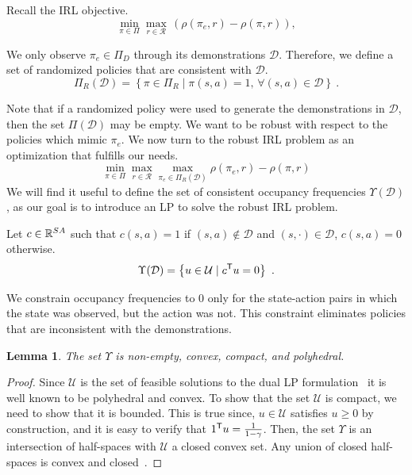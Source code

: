\documentclass[10pt]{article}
\renewcommand{\cite}{\citep}
\newtheorem{lemma}{Lemma}
\begin{document}
Recall the IRL objective.
\begin{equation}
	\min_{\pi \in \Pi} \max_{r \in \mathcal{R}}  \, (\rho(\pi_e, r) - \rho(\pi, r)),
\end{equation}

We only observe $\pi_e \in \Pi_D$ through its demonstrations $\mathcal{D}$. Therefore, we define a set of randomized policies that are consistent with $\mathcal{D}$.
%
\begin{equation} \label{eq:consistent-policies}
	\Pi_R(\mathcal{D}) = \left\{ \pi \in \Pi_R \mid \pi(s,a) = 1, \, \forall (s,a) \in \mathcal{D} \right\}~.
\end{equation}

Note that if a randomized policy were used to generate the demonstrations in
$\mathcal{D}$, then the set $\Pi(\mathcal{D})$ may be empty. We want to be robust with respect to the policies which mimic $\pi_e$.
We now turn to the robust IRL problem as an optimization that fulfills our needs.
%
\begin{equation}
	\label{eq:robust_IRL_formulation}
	\min_{\pi \in \Pi} \max_{r \in \mathcal{R}} \max_{\pi_e \in \Pi_{R}(\mathcal{D})} \rho(\pi_e, r) - \rho(\pi, r)
\end{equation}
%
We will find it useful to define the set of consistent occupancy frequencies $\Upsilon(\mathcal{D})$, as our goal is to introduce an LP to solve
the robust IRL problem.

Let $c \in \mathbb{R}^{SA}$ such that $c(s,a) = 1$ if $(s,a) \notin \mathcal{D}$ and $(s, \cdot) \in \mathcal{D}$, $c(s,a)  = 0$ otherwise.
%
\begin{equation}\label{eq:consistent-occupancies}
	\Upsilon(\mathcal{D}) = \left\{ u \in \mathcal{U} \mid c^{\mathsf{T}} u = 0  \right\}~.
\end{equation}


We constrain occupancy frequencies to 0 only for the state-action pairs in which the state was observed, but the action was not. This constraint eliminates policies that are inconsistent with the demonstrations.
%
\begin{lemma}\label{prop:convexity_of_Upsilon}
The set $\Upsilon$ is non-empty, convex, compact, and polyhedral.
\end{lemma}
\begin{proof}
Since $\mathcal{U}$ is the set of feasible solutions to the dual LP formulation~\cite[Eq.~(6.9.2)]{Puterman1994} it is well known to be polyhedral and convex. To show that the set $\mathcal{U}$ is compact, we need to show that it is bounded. This is true since, $u \in \mathcal{U}$ satisfies $u \ge 0$ by construction, and it is easy to verify that $1^{\mathsf{T}} u = \frac{1}{1-\gamma}$. Then, the set $\Upsilon$ is an intersection of half-spaces with $\mathcal{U}$ a closed convex set. Any union of closed half-spaces is convex and closed~\cite[eq.~(2.2.1)]{boyd_convex_optimization}.
\end{proof}
\end{document}
